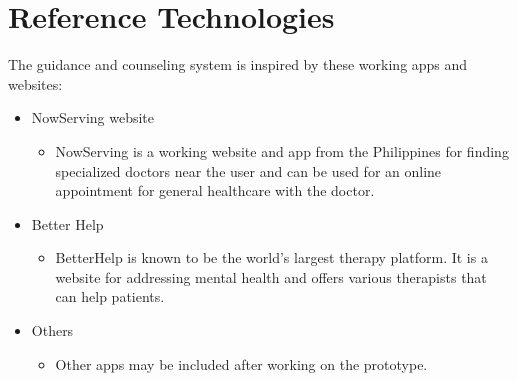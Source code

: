 \section{Reference Technologies}
The guidance and counseling system is inspired by these working apps and websites: 
\begin{itemize}
\item NowServing website \cite{nowserving2020}
	\begin{itemize}
	\item NowServing is a working website and app from the Philippines for finding specialized doctors near the user and can be used for an online appointment for general healthcare with the doctor. 
	\end{itemize}
\item Better Help \cite{betterhelp2021}
	\begin{itemize}
	\item BetterHelp is known to be the world's largest therapy platform. It is a website for addressing mental health and offers various therapists that can help patients. 
	\end{itemize}
\item Others
	\begin{itemize}
	\item Other apps may be included after working on the prototype.
	\end{itemize}
\end{itemize}












